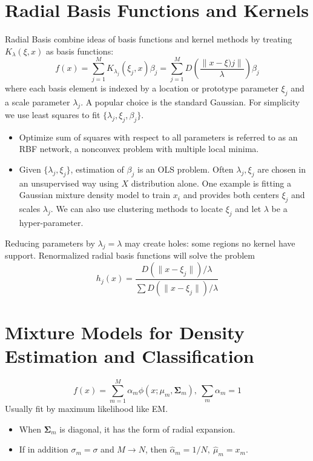 \section{Radial Basis Functions and Kernels}
Radial Basis combine ideas of basis functions and kernel methods by treating 
$K_{\lambda}(\xi,x)$ as basis functions: 
\begin{equation*}
f(x)=\sum_{j=1}^MK_{\lambda_j}(\xi_j,x)\beta_j=\sum_{j=1}^MD\left(\frac{\|x-\xi)j\|}{\lambda}
\right)\beta_j
\end{equation*}
where each basis element is indexed by a location or prototype parameter $\xi_j$ and a scale
parameter $\lambda_j$. A popular choice is the standard Gaussian. For simplicity we use least
squares to fit $\{\lambda_j,\xi_j,\beta_j\}$. 
\begin{itemize}
\item Optimize sum of squares with respect to all parameters is referred to as an RBF network, 
a nonconvex problem with multiple local minima. 
\item Given $\{\lambda_j,\xi_j\}$, estimation of $\beta_j$ is an OLS problem. Often
$\lambda_j,\xi_j$ are chosen in an unsupervised way using $X$ distribution alone. One example
is fitting a Gaussian mixture density model to train $x_i$ and provides both centers $\xi_j$ 
and scales $\lambda_j$. We can also use clustering methods to locate $\xi_j$ and let $\lambda$
be a hyper-parameter.  
\end{itemize}

Reducing parameters by $\lambda_j=\lambda$ may create holes: some regions no kernel have support. 
Renormalized radial basis functions will solve the problem
\begin{equation*}
h_j(x)=\frac{D(\|x-\xi_j\|)/\lambda}{\sum D(\|x-\xi_j\|)/\lambda}
\end{equation*}

\section{Mixture Models for Density Estimation and Classification}
\begin{equation*}
f(x)=\sum_{m=1}^M\alpha_m\phi(x;\mu_m,\mathbf{\Sigma}_m),~\sum_m\alpha_m=1
\end{equation*}
Usually fit by maximum likelihood like EM. 
\begin{itemize}
\item When $\mathbf{\Sigma}_m$ is diagonal, it has the form of radial expansion.
\item If in addition $\sigma_m=\sigma$ and $M\rightarrow N$, then $\hat{\alpha}_m=1/N,~
\hat{\mu}_m=x_m$. 
\end{itemize}

